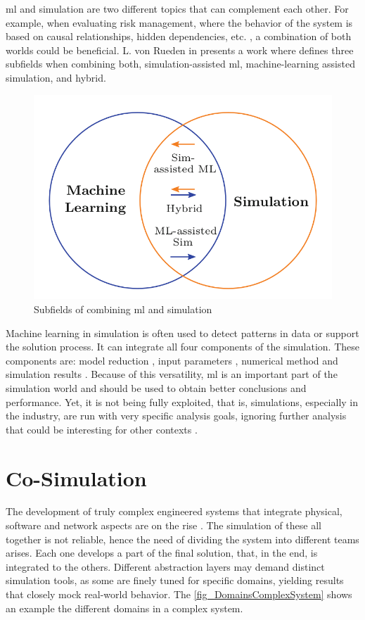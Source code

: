 \gls{ml} and simulation are two different topics that can complement each other. For example, when evaluating risk management, where the behavior of the system is based on causal relationships, hidden dependencies, etc. \cite{mitchell2017natural}, a combination of both worlds could be beneficial.  L. von Rueden in \cite{von2020combining} presents a work where defines three subfields when combining both, simulation-assisted \gls{ml}, machine-learning assisted simulation, and hybrid.

\begin{figure}[H]
	\centering
 	\includegraphics[width=0.5\linewidth]{Images/SimAndML.png}
 	\caption{Subfields of combining \gls{ml} and simulation \cite{von2020combining}}
	 \label{fig_AdalineSquematic}
\end{figure}

Machine learning in simulation is often used to detect patterns in data or support the solution process. It can integrate all four components of the simulation. These components are: model reduction \cite{benner2015survey}, input parameters \cite{tsymbalov2019deeper}, numerical method \cite{noe2020machine} and simulation results \cite{albertsson2018machine}. Because of this versatility, \gls{ml} is an important part of the simulation world and should be used to obtain better conclusions and performance. Yet, it is not being fully exploited, that is, simulations, especially in the industry, are run with very specific analysis goals, ignoring further analysis that could be interesting for other contexts \cite{von2020combining}.

\section{Co-Simulation}

The development of truly complex engineered systems that integrate physical, software and network aspects are on the rise \cite{gomes2017co}. The simulation of these all together is not reliable, hence the need of dividing the system into different teams arises. Each one develops a part of the final solution, that, in the end, is integrated to the others. Different abstraction layers may demand distinct simulation tools, as some are finely tuned for specific domains, yielding results that closely mock real-world behavior. The \autoref{fig_DomainsComplexSystem} shows an example the different domains in a complex system. 

